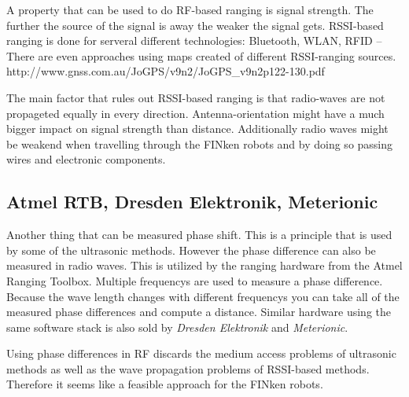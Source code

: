 A property that can be used to do RF-based ranging is signal strength.
The further the source of the signal is away the weaker the signal gets.
RSSI-based ranging is done for serveral different technologies: Bluetooth, WLAN, RFID –
There are even approaches using maps created of different RSSI-ranging sources. http://www.gnss.com.au/JoGPS/v9n2/JoGPS\_v9n2p122-130.pdf 

The main factor that rules out RSSI-based ranging is that radio-waves are not propageted equally in every direction. 
Antenna-orientation might have a much bigger impact on signal strength than distance.
Additionally radio waves might be weakend when travelling through the FINken robots and by doing so passing wires and electronic components.

\subsection{Atmel RTB, Dresden Elektronik, Meterionic}

Another thing that can be measured phase shift.
This is a principle that is used by some of the ultrasonic methods.
However the phase difference can also be measured in radio waves.
This is utilized by the ranging hardware from the Atmel Ranging Toolbox.
Multiple frequencys are used to measure a phase difference.
Because the wave length changes with different frequencys you can take all of the measured phase differences and compute a distance.
Similar hardware using the same software stack is also sold by \emph{Dresden Elektronik} and \emph{Meterionic}.

Using phase differences in RF discards the medium access problems of ultrasonic methods as well as the wave propagation problems of RSSI-based methods.
Therefore it seems like a feasible approach for the FINken robots.

